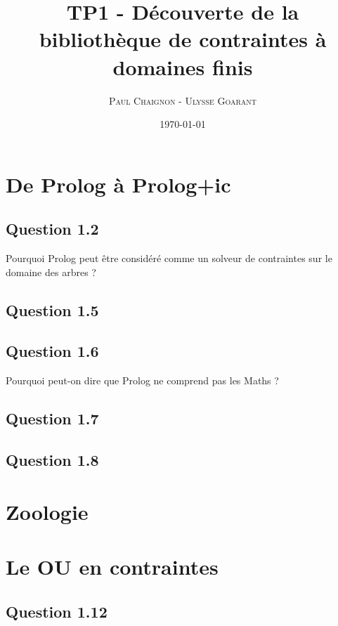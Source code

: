 \documentclass[a4paper,12pt]{article}
\title{TP1 - Découverte de la bibliothèque de contraintes à domaines finis}
\author{\textsc{Paul Chaignon} - \textsc{Ulysse Goarant}}
\date{\today}
\begin{document}
\maketitle

\section{De Prolog à Prolog+ic}


\vspace{2cm}

\subsection*{Question 1.2}
Pourquoi Prolog peut être considéré comme un solveur de contraintes sur le domaine des arbres ?

\subsection*{Question 1.5}

\subsection*{Question 1.6}
Pourquoi peut-on dire que Prolog ne comprend pas les Maths ?

\subsection*{Question 1.7}


\subsection*{Question 1.8}


\section{Zoologie}


\vspace{2cm}


\section{Le OU en contraintes}


\vspace{2cm}

\subsection*{Question 1.12}
\end{document}
